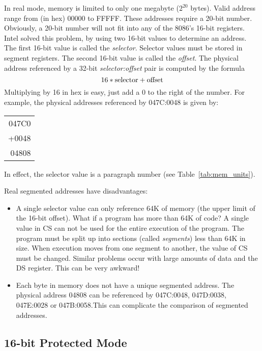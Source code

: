 In  real mode, memory is limited to only one megabyte ($2^{20}$ bytes). 
Valid
address range from (in hex) 00000 to FFFFF.\@  %
These addresses require a 20-bit number. Obviously, a 20-bit number will not
fit into any of the 8086's 16-bit registers. Intel solved this problem, by
using two 16-bit values to determine an address. The first 16-bit value is called
the \emph{selector}. Selector values must be stored in segment registers. The
second 16-bit value is called the \emph{offset}. The physical address 
referenced by a 32-bit \emph{selector:offset} pair is computed by the formula
\[ 16 * {\rm selector} + {\rm offset} \]
Multiplying by 16 in hex is easy, just add a 0 to the right of the number. For
example, the physical addresses referenced by 047C:0048 is given by:
\begin{center}
\begin{tabular}{r}
047C0 \\
+0048 \\
\hline
04808 \\
\end{tabular}
\end{center}
In effect, the selector value is a paragraph number
(see Table~\ref{tab:mem_units}).

Real segmented addresses have disadvantages:
\begin{itemize}
\item A single selector value can only reference 64K of memory (the
upper limit of the 16-bit offset). What if a program has more than 64K
of code? A single value in CS can not be used for the entire execution
of the program.  The program must be split up into sections (called
\emph{segments}) less than 64K in size. When
execution moves from one segment to another, the value of CS must be
changed. Similar problems occur with large amounts of data and the DS
register. This can be very awkward!

\item Each byte in memory does not have a unique segmented address. The 
physical address 04808 can be referenced by 047C:0048, 047D:0038, 047E:0028
or 047B:0058.\@ This can complicate the comparison of segmented addresses.

\end{itemize}

\subsection{16-bit Protected Mode \label{16prot_mode} }

